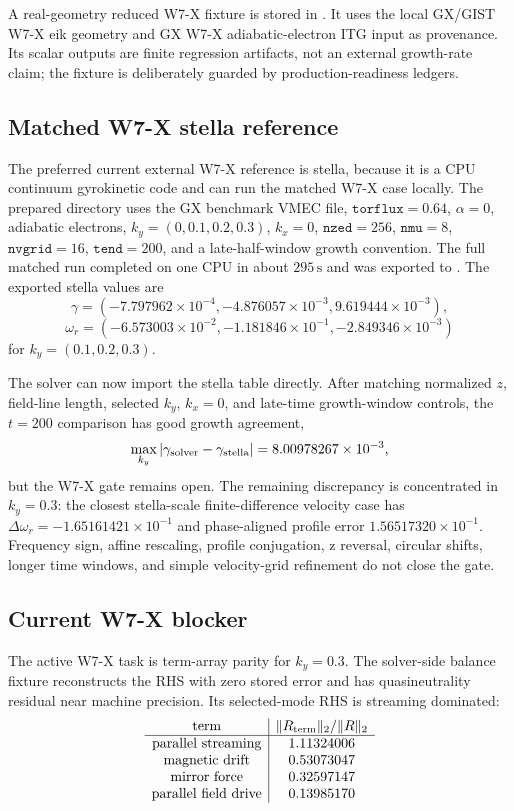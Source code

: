 \documentclass[11pt,a4paper]{article}
\begin{document}
A real-geometry reduced W7-X fixture is stored in
.  It uses the local GX/GIST W7-X eik
geometry and GX W7-X adiabatic-electron ITG input as provenance.  Its scalar
outputs are finite regression artifacts, not an external growth-rate claim; the
fixture is deliberately guarded by production-readiness ledgers.

\subsection{Matched W7-X stella reference}

The preferred current external W7-X reference is stella, because it is a CPU
continuum gyrokinetic code and can run the matched W7-X case locally.  The
prepared directory  uses the GX
benchmark VMEC file, \(\texttt{torflux}=0.64\), \(\alpha=0\), adiabatic
electrons, \(k_y=(0,0.1,0.2,0.3)\), \(k_x=0\), \(\texttt{nzed}=256\),
\(\texttt{nmu}=8\), \(\texttt{nvgrid}=16\), \(\texttt{tend}=200\), and a
late-half-window growth convention.  The full matched run completed on one CPU
in about \(295\,\mathrm{s}\) and was exported to
.  The exported
stella values are
\[
\gamma=(-7.797962\times10^{-4},-4.876057\times10^{-3},9.619444\times10^{-3}),
\]
\[
\omega_r=(-6.573003\times10^{-2},-1.181846\times10^{-1},-2.849346\times10^{-3})
\]
for \(k_y=(0.1,0.2,0.3)\).

The solver can now import the stella  table directly.  After
matching normalized \(z\), field-line length, selected \(k_y\), \(k_x=0\), and
late-time growth-window controls, the \(t=200\) comparison has good growth
agreement,
\[
\max_{k_y}|\gamma_{\rm solver}-\gamma_{\rm stella}|=8.00978267\times10^{-3},
\]
but the W7-X gate remains open.  The remaining discrepancy is concentrated in
\(k_y=0.3\): the closest stella-scale finite-difference velocity case has
\(\Delta\omega_r=-1.65161421\times10^{-1}\) and phase-aligned profile error
\(1.56517320\times10^{-1}\).  Frequency sign, affine rescaling, profile
conjugation, z reversal, circular shifts, longer time windows, and simple
velocity-grid refinement do not close the gate.

\subsection{Current W7-X blocker}

The active W7-X task is term-array parity for \(k_y=0.3\).  The solver-side
balance fixture  reconstructs the RHS
with zero stored error and has quasineutrality residual near machine precision.
Its selected-mode RHS is streaming dominated:
\[
\begin{array}{c|c}
\hbox{term} & \|R_{\rm term}\|_2/\|R\|_2 \\
\hline
\hbox{parallel streaming} & 1.11324006\\
\hbox{magnetic drift} & 0.53073047\\
\hbox{mirror force} & 0.32597147\\
\hbox{parallel field drive} & 0.13985170
\end{array}
\]
\end{document}
